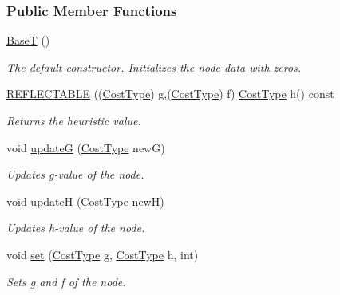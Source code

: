 \subsubsection*{Public Member Functions}
\begin{DoxyCompactItemize}
\item 
\hyperlink{structslb_1_1ext_1_1node_1_1BaseT_ada1f4e02d2850b60142fe1ea350b449f}{BaseT} ()\hypertarget{structslb_1_1ext_1_1node_1_1BaseT_ada1f4e02d2850b60142fe1ea350b449f}{}\label{structslb_1_1ext_1_1node_1_1BaseT_ada1f4e02d2850b60142fe1ea350b449f}

\begin{DoxyCompactList}\small\item\em The default constructor. Initializes the node data with zeros. \end{DoxyCompactList}\item 
\hyperlink{structslb_1_1ext_1_1node_1_1BaseT_ab29d45f068f928c9d7faca908e610801}{R\+E\+F\+L\+E\+C\+T\+A\+B\+LE} ((\hyperlink{structslb_1_1ext_1_1node_1_1BaseT_a25e9417da3d5610b8d379927697ed848}{Cost\+Type}) g,(\hyperlink{structslb_1_1ext_1_1node_1_1BaseT_a25e9417da3d5610b8d379927697ed848}{Cost\+Type}) f) \hyperlink{structslb_1_1ext_1_1node_1_1BaseT_a25e9417da3d5610b8d379927697ed848}{Cost\+Type} h() const 
\begin{DoxyCompactList}\small\item\em Returns the heuristic value. \end{DoxyCompactList}\item 
void \hyperlink{structslb_1_1ext_1_1node_1_1BaseT_aa4a669774984fc1f36e459469910c356}{updateG} (\hyperlink{structslb_1_1ext_1_1node_1_1BaseT_a25e9417da3d5610b8d379927697ed848}{Cost\+Type} newG)
\begin{DoxyCompactList}\small\item\em Updates g-\/value of the node. \end{DoxyCompactList}\item 
void \hyperlink{structslb_1_1ext_1_1node_1_1BaseT_ad08ea419ac90831947e8eecf70045dc6}{updateH} (\hyperlink{structslb_1_1ext_1_1node_1_1BaseT_a25e9417da3d5610b8d379927697ed848}{Cost\+Type} newH)
\begin{DoxyCompactList}\small\item\em Updates h-\/value of the node. \end{DoxyCompactList}\item 
void \hyperlink{structslb_1_1ext_1_1node_1_1BaseT_ab2113028f54e4267fa9a613354f3b843}{set} (\hyperlink{structslb_1_1ext_1_1node_1_1BaseT_a25e9417da3d5610b8d379927697ed848}{Cost\+Type} g, \hyperlink{structslb_1_1ext_1_1node_1_1BaseT_a25e9417da3d5610b8d379927697ed848}{Cost\+Type} h, int)
\begin{DoxyCompactList}\small\item\em Sets g and f of the node. \end{DoxyCompactList}\end{DoxyCompactItemize}


